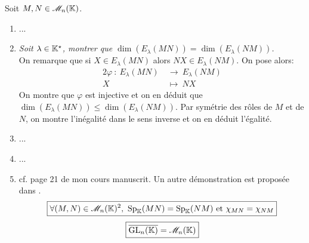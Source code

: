 Soit $M, N \in \mathscr{M}_n(\mathbb{K})$. 
\begin{enumerate}
    \item ...
    \item \emph{Soit $\lambda \in \mathbb{K}^\star$, montrer que $\dim(E_\lambda (MN)) = \dim(E_\lambda (NM))$.} \\
    On remarque que si $X \in E_\lambda (MN)$ alors $NX \in E_\lambda (NM)$. On pose alors:
    \begin{alignat*}{2}
        \varphi\ :\ E_\lambda (MN)\ &\longrightarrow\ E_\lambda (NM)\\
        X\ &\longmapsto\ NX
    \end{alignat*}
    On montre que $\varphi$ est injective et on en déduit que $\dim(E_\lambda (MN)) \leqslant \dim(E_\lambda (NM))$. Par symétrie des rôles de $M$ et de $N$, on montre l'inégalité dans le sens inverse et on en déduit l'égalité.
    \item ...
    \item ...
    \item cf. page 21 de mon cours manuscrit. Un autre démonstration est proposée dans .
    $$\boxed{\forall (M, N) \in \mathscr{M}_n(\mathbb{K})^2,\ \mathrm{Sp}_{\mathbb{K}}(MN) = \mathrm{Sp}_{\mathbb{K}}(NM) \text{ et } \chi_{MN} = \chi_{NM}}$$
    $$\boxed{\overline{\mathrm{GL}_n(\mathbb{K})} = \mathscr{M}_n(\mathbb{K})}$$
\end{enumerate}